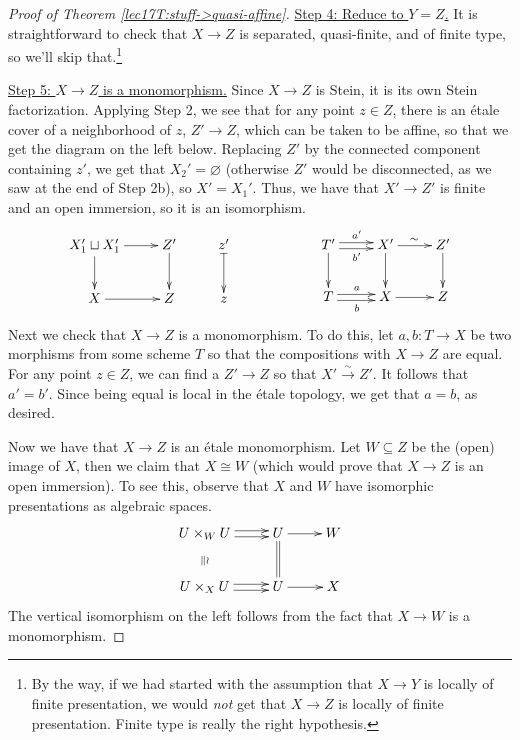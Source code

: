 \begin{proof}[Proof of Theorem \ref{lec17T:stuff->quasi-affine}]
   \underline{Step 4: Reduce to $Y=Z$.} It is straightforward to check that $X\to Z$ is
   separated, quasi-finite, and of finite type, so we'll skip that.\footnote{By the way,
   if we had started with the assumption that $X\to Y$ is locally of finite presentation,
   we would \emph{not} get that $X\to Z$ is locally of finite presentation. Finite type
   is really the right hypothesis.} 

   \underline{Step 5: $X\to Z$ is a monomorphism.}
   Since $X\to Z$ is Stein, it is its own Stein factorization. Applying Step 2, we see
   that for any point $z\in Z$, there is an \'etale cover of a neighborhood of $z$,
   $Z'\to Z$, which can be taken to be affine, so that we get the diagram on the left
   below. Replacing $Z'$ by the connected component containing $z'$, we get that
   $X_2'=\varnothing$ (otherwise $Z'$ would be disconnected, as we saw at the end of Step
   2b), so $X'=X_1'$. Thus, we have that $X'\to Z'$ is finite and an open immersion, so
   it is an isomorphism.
   \[\xymatrix{
    X_1'\sqcup X_1' \ar[r] \ar[d] & Z'\ar[d] & z'\ar@{|->}[d]\\
    X\ar[r] & Z & z
   }\qquad\qquad\qquad
   \xymatrix{
    T'\ar@<.5ex>[r]^{a'}\ar@<-.5ex>[r]_{b'} \ar[d] & X'\ar[r]^\sim \ar[d]& Z'\ar[d]\\
    T\ar@<.5ex>[r]^{a}\ar@<-.5ex>[r]_{b} & X\ar[r] & Z
   }\]
    Next we check that $X\to Z$ is a monomorphism. To do this, let $a,b:T\to X$ be two
   morphisms from some scheme $T$ so that the compositions with $X\to Z$ are equal. For
   any point $z\in Z$, we can find a $Z'\to Z$ so that $X'\xrightarrow\sim Z'$. It
   follows that $a'=b'$. Since being equal is local in the \'etale topology, we get that
   $a=b$, as desired.

   Now we have that $X\to Z$ is an \'etale monomorphism. Let $W\subseteq Z$ be the (open)
   image of $X$, then we claim that $X\cong W$ (which would prove that $X\to Z$ is an
   open immersion). To see this, observe that $X$ and $W$ have isomorphic presentations
   as algebraic spaces.
   \[\xymatrix{
    U\times_W U \ar@<.5ex>[r]\ar@<-.5ex>[r] & U\ar@{=}[d] \ar[r] & W\\
    U\times_X U \ar@{}[u]|{\parallel\wr} \ar@<.5ex>[r]\ar@<-.5ex>[r] & U \ar[r] & X
   }\]
   The vertical isomorphism on the left follows from the fact that $X\to W$ is a
   monomorphism.
 \end{proof}



